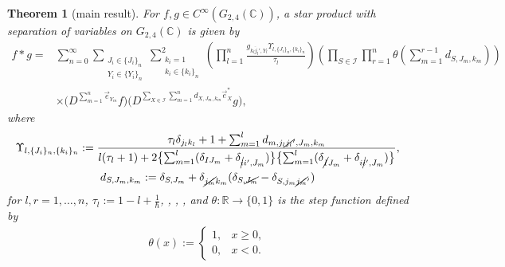 \documentclass[pdftex]{sigma}
\numberwithin{equation}{section}
\newtheorem{Theorem}{Theorem}[section]
\begin{document}
\begin{Theorem}[main result]\label{thm_star_prd_G2_4}
For $f,g\in C^{\infty}(G_{2,4}(\mathbb{C}))$, a star product with separation of variables on $G_{2,4}(\mathbb{C})$ is given by
\begin{align}
 f \ast g
={}&
 \sum_{n=0}^{\infty}
 \sum_{
 \substack{
 J_{i}
 \in
\{
 J_{i}
\}_{n}\\
 Y_{i}
 \in
\{
 Y_{i}
\}_{n}
 }
 }
 \sum_{
 \substack{
 k_{i}=1\\
 k_{i}
 \in
\{
 k_{i}
\}_{n}
 }
 }^{2}
 \left(
 \prod_{l=1}^{n}
 \frac{
 g_{\overline{k_{l}j_{l}'},Y_{l}}
 \Upsilon_{
 l,
 \{
 J_{i}
 \}_{n},
 \{
 k_{i}
 \}_{n}
 }
 }{\tau_{l}}
 \right)
 \left(
 \prod_{
 S
 \in
 \mathcal{I}
 }
 \prod_{r=1}^{n}
 \theta
 \left(
 \sum_{m=1}^{r-1}
 d_{
 S,
 J_{m},
 k_{m}
 }
 \right)
 \right)
 \nonumber
 \\
 &
 \times
 \bigl(
 D^{
 \sum_{m=1}^{n}
 \vec{e}_{{Y_{m}}}
 }
 f
 \bigr)
 \bigl(
 D^{
 \sum_{
 X
 \in
 \mathcal{I}
 }
 \sum_{m=1}^{n}
 d_{
 X,
 J_{m},
 k_{m}
 }
 \vec{e}_{X}^{\ast}
 }
 g
 \bigr),
 \label{star_prd_G2_4}
\end{align}
where
\begin{gather*}
 \Upsilon_{
 l,
 \{
 J_{i}
 \}_{n},
 \{
 k_{i}
 \}_{n}
 }
 :=
 \frac{
 \tau_{l}
 \delta_{j_{l}k_{l}}
 +
 1
 +
 \sum_{m=1}^{l}
 d_{
 m,
 j_{l}\cancel{j_{l}}',
 J_{m},
 k_{m}
 }
 }{
 l
 (
 \tau_{l}+1
 )
 +
 2
 \bigl\{
 \sum_{m=1}^{l}
 (
 \delta_{IJ_{m}}
 +
 \delta_{\cancel{i}i',J_{m}}
 )
 \bigr\}
 \bigl\{
 \sum_{m=1}^{l}
 (
 \delta_{\cancel{I}J_{m}}
 +
 \delta_{i\cancel{i}',J_{m}}
 )
 \bigr\}
 },
 \\
 d_{
 S,
 J_{m},
 k_{m}
 }
 :=
 \delta_{
 S,
 J_{m}
 }
 +
 \delta_{\cancel{j_{m}}k_{m}}
 (
 \delta_{
 S,
 \cancel{J_{m}}
 }
 -
 \delta_{
 S,
 j_{m}\cancel{j_{m}}'
 }
 )
\end{gather*}
for $l,r=1,\dots,n$,
$
\tau_{l}
 :=
 1
 -
 l
 +
 \frac{1}{\hbar}
$,
,
,
,
and
$\theta\colon \mathbb{R}\to\{0,1\}$
is the step function defined by
\begin{align*}
 \theta(x)
 :=
 \begin{cases}
 1, & x\geq0,
 \\
 0, & x<0.
 \end{cases}
\end{align*}
\end{Theorem}
\end{document}
